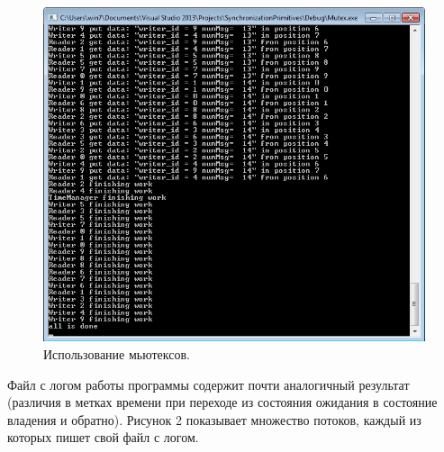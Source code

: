 \documentclass[a4paper, 12pt]{article}		%
\begin{document}
\begin{figure}[h!]
\centering
\includegraphics[scale=1]{res/001}
\caption{Использование мьютексов.}
\end{figure}

Файл с логом работы программы содержит почти аналогичный результат (различия в метках времени при переходе из состояния ожидания в состояние владения и обратно). Рисунок 2 показывает множество потоков, каждый из которых пишет свой файл с логом.
\end{document}

